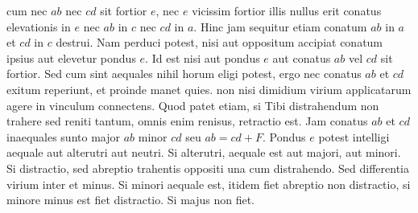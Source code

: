  cum nec $ab$ nec $cd$ sit fortior $e$, nec $e$ vicissim fortior illis nullus erit conatus elevationis\protect{} in $e$ nec $ab$ in $c$ nec $cd$ in $a$.
\pend
\pstart%
Hinc jam sequitur etiam conatum $ab$ in $a$ et $cd$ in $c$ destrui.
Nam  perduci potest, nisi aut oppositum accipiat conatum ipsius aut elevetur pondus $e$.\protect{}
Id est nisi aut pondus $e$ aut conatus $ab$ vel $cd$ sit fortior.
Sed cum sint aequales nihil horum eligi potest, ergo nec conatus $ab$ et $cd$ exitum reperiunt, et proinde manet quies.
\pend
\pstart%
   non nisi dimidium virium applicatarum agere in vinculum connectens.
Quod patet etiam, si Tibi  distrahendum non trahere sed reniti tantum, omnis enim renisus, retractio est.
\pend
\pstart%
Jam conatus $ab$ et $cd$ inaequales sunto major $ab$ minor $cd$ seu $ab = cd+F$.
Pondus\protect{} $e$ potest intelligi aequale aut alterutri aut neutri.
Si alterutri, aequale est aut majori, aut minori.
Si  distractio,\protect{} sed abreptio trahentis oppositi una cum distrahendo.
Sed differentia virium\protect{} inter  et minus.
Si minori aequale est, itidem fiet abreptio non distractio, si minore minus est fiet distractio.\protect{}
Si majus non fiet.
